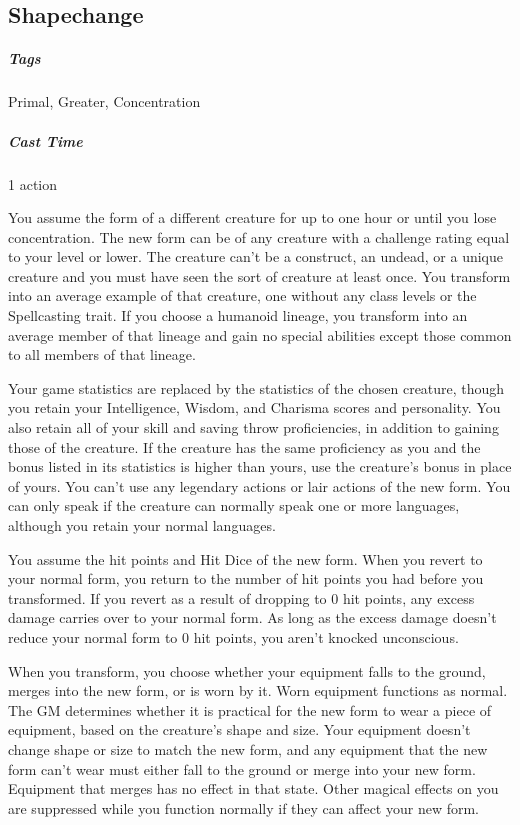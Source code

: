 

\subsection{Shapechange}
\subparagraph*{Tags} Primal, Greater, Concentration
\subparagraph*{Cast Time} 1 action

You assume the form of a different creature for up to one hour or until you lose concentration. The new form can be of any creature with a challenge rating equal to your level or lower. The creature can’t be a construct, an undead, or a unique creature and you must have seen the sort of creature at least once. You transform into an average example of that creature, one without any class levels or the Spellcasting trait. If you choose a humanoid lineage, you transform into an average member of that lineage and gain no special abilities except those common to all members of that lineage.

Your game statistics are replaced by the statistics of the chosen creature, though you retain your Intelligence, Wisdom, and Charisma scores and personality. You also retain all of your skill and saving throw proficiencies, in addition to gaining those of the creature. If the creature has the same proficiency as you and the bonus listed in its statistics is higher than yours, use the creature’s bonus in place of yours. You can’t use any legendary actions or lair actions of the new form. You can only speak if the creature can normally speak one or more languages, although you retain your normal languages.

You assume the hit points and Hit Dice of the new form. When you revert to your normal form, you return to the number of hit points you had before you transformed. If you revert as a result of dropping to 0 hit points, any excess damage carries over to your normal form. As long as the excess damage doesn’t reduce your normal form to 0 hit points, you aren’t knocked unconscious. 

When you transform, you choose whether your equipment falls to the ground, merges into the new form, or is worn by it. Worn equipment functions as normal. The GM determines whether it is practical for the new form to wear a piece of equipment, based on the creature’s shape and size. Your equipment doesn’t change shape or size to match the new form, and any equipment that the new form can’t wear must either fall to the ground or merge into your new form. Equipment that merges has no effect in that state. Other magical effects on you are suppressed while you function normally if they can affect your new form.

